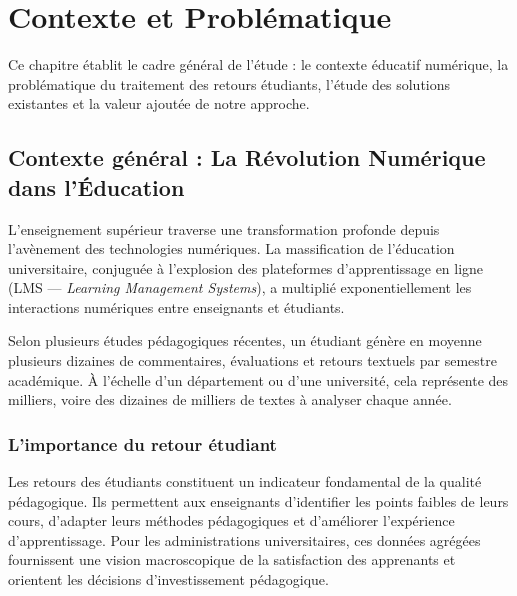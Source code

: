 \chapter{Contexte et Problématique}

\begin{infobox}
Ce chapitre établit le cadre général de l'étude : le contexte éducatif
numérique, la problématique du traitement des retours étudiants, l'étude
des solutions existantes et la valeur ajoutée de notre approche.
\end{infobox}

\section{Contexte général : La Révolution Numérique dans l'Éducation}

L'enseignement supérieur traverse une transformation profonde depuis
l'avènement des technologies numériques. La massification de l'éducation
universitaire, conjuguée à l'explosion des plateformes d'apprentissage en
ligne (LMS — \textit{Learning Management Systems}), a multiplié
exponentiellement les interactions numériques entre enseignants et étudiants.

Selon plusieurs études pédagogiques récentes, un étudiant génère en moyenne
plusieurs dizaines de commentaires, évaluations et retours textuels par
semestre académique. À l'échelle d'un département ou d'une université,
cela représente des milliers, voire des dizaines de milliers de textes à
analyser chaque année.

\subsection{L'importance du retour étudiant}

Les retours des étudiants constituent un indicateur fondamental de la
qualité pédagogique. Ils permettent aux enseignants d'identifier les points
faibles de leurs cours, d'adapter leurs méthodes pédagogiques et d'améliorer
l'expérience d'apprentissage. Pour les administrations universitaires, ces
données agrégées fournissent une vision macroscopique de la satisfaction des
apprenants et orientent les décisions d'investissement pédagogique.

